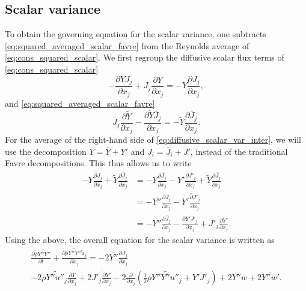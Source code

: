 \documentclass[oneside,a4paper,11pt]{report}
\newcommand{\rhoavg}{\overline{\rho}}
\newcommand{\wavg}{\overline{w}}
\newcommand{\Javg}{\overline{J}}
\newcommand{\Yavg}{\overline{Y}}
\newcommand{\wfluc}{w'}
\newcommand{\Jfluc}{J'}
\newcommand{\Yfluc}{Y'}
\newcommand{\uavgf}{\widetilde{u}}
\newcommand{\Yavgf}{\widetilde{Y}}
\newcommand{\Yflucf}{Y''}
\newcommand{\uflucf}{u''}
\begin{document}
\subsection{Scalar variance}
To obtain the governing equation for the scalar variance, one subtracts \cref{eq:squared_averaged_scalar_favre} from the Reynolds average of \cref{eq:cons_squared_scalar}. We first regroup the diffusive scalar flux terms of \cref{eq:cons_squared_scalar}
\begin{equation}
    \label{eq:diffusive_scalar_var_inter}
    -\frac{\partial Y J_j}{\partial x_j} + J_j \frac{\partial Y}{\partial x_j} = -Y \frac{\partial J_j}{\partial x_j},
\end{equation}
and \cref{eq:squared_averaged_scalar_favre}
\begin{equation}
    \Javg_j \frac{\partial \Yavgf}{\partial x_j} - \frac{\partial \Yavgf \Javg_j}{\partial x_j} = -\Yavgf \frac{\partial \Javg_j}{\partial x_j}.
\end{equation}
For the average of the right-hand side of \cref{eq:diffusive_scalar_var_inter}, we will use the decomposition $Y = \Yavg + \Yfluc$ and $J_i = \Javg_i + \Jfluc$, instead of the traditional Favre decompositions. This thus allows us to write
\begin{align}
    -\overline{ Y \frac{\partial J_j}{\partial x_j} } + \Yavgf \frac{\partial \Javg_j }{\partial x_j} &= -\Yavg \frac{\partial \Javg_j }{\partial x_j} - \overline{ \Yfluc \frac{\partial \Jfluc_j}{\partial x_j} } + \Yavgf \frac{\partial \Javg_j}{\partial x_j} \nonumber \\
    &= -\overline{ \Yflucf } \frac{\partial \Javg_j}{\partial x_j} - \overline{ \Yfluc \frac{\partial \Jfluc_j}{\partial x_j} } \nonumber \\
    &= -\overline{ \Yflucf } \frac{\partial \Javg_j }{\partial x_j} - \frac{\partial \overline{ \Yfluc \Jfluc_j } }{\partial x_j} + \overline{ \Jfluc_j \frac{\partial \Yfluc}{\partial x_j} }.
\end{align}
Using the above, the overall equation for the scalar variance is written as
\begin{multline}
    \label{eq:scalar_variance_favre}
    \frac{\partial \rhoavg \widetilde{\Yflucf \Yflucf}}{\partial t} + \frac{\partial \rhoavg \widetilde{\Yflucf \Yflucf} \uavgf_j }{\partial x_j} = -2 \overline{ \Yflucf } \frac{\partial \Javg_j }{\partial x_j} \\
    -2 \rhoavg \widetilde{\Yflucf \uflucf_j} \frac{\partial \Yavgf}{\partial x_j} + 2 \overline{ \Jfluc_j \frac{\partial \Yfluc}{\partial x_j} } - 2 \frac{\partial}{\partial x_j} \left ( \frac{1}{2} \rhoavg \widetilde{\Yflucf \Yflucf \uflucf_j} +  \overline{ \Yfluc \Jfluc_j } \right ) + 2 \overline{ \Yflucf } \wavg + 2 \overline{ \Yflucf \wfluc }.
\end{multline}
\end{document}
